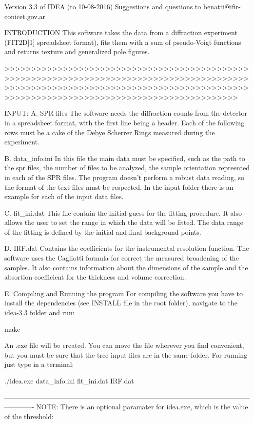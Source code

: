 Version 3.3 of IDEA (to 10-08-2016)
Suggestions and questions to benatti@ifir-conicet.gov.ar

INTRODUCTION
This software takes the data from a diffraction experiment (FIT2D[1] spreadsheet format), fits them with a sum of pseudo-Voigt functions and returns texture and generalized pole figures.

>>>>>>>>>>>>>>>>>>>>>>>>>>>>>>>>>>>>>>>>>>>>>>>>>>>>>>>>>>>>>>>>>>>>>>>>>>>>>>>>>>>>>>>>>>>>>>>>>>>>>>>>>>>>>>>>>>>>>>>>>>>>>>>>>>>>>>>>>>>>>>>>>>>>>>>>>>>>>>>>>>>>>>>>>>>>>>>>>>>>>>

INPUT:
A. SPR files
The software needs the diffraction counts from the detector in a spreadsheet format, with the first line being a header. Each of the following rows must be a cake of the Debye Scherrer Rings measured during the experiment.

B. data_info.ini
In this file the main data must be specified, such as the path to the spr files, the number of files to be analyzed, the sample orientation repreented in each of the SPR files. The program doesn't perform a robust data reading, so the format of the text files must be respected. In the input folder there is an example for each of the input data files.

C. fit_ini.dat
This file contain the initial guess for the fitting procedure. It also allows the user to set the range in which the data will be fitted. The data range of the fitting is defined by the initial and final background points.

D. IRF.dat
Contains the coefficients for the instrumental resolution function. The software uses the Cagliotti formula for correct the measured broadening of the samples. It also contains information about the dimensions of the sample and the absortion coefficient for the thickness and volume correction.

E. Compiling and Running the program
For compiling the software you have to install the dependencies (see INSTALL file in the root folder), navigate to the idea-3.3 folder and run:

make

An .exe file will be created. You can move the file wherever you find convenient, but you must be sure that the tree input files are in the same folder. For running just type in a terminal:

./idea.exe data_info.ini fit_ini.dat IRF.dat

-------------------------------------------------------------------------------------------------------------------------
NOTE: There is an optional paramater for idea.exe, which is the value of the threshold:

